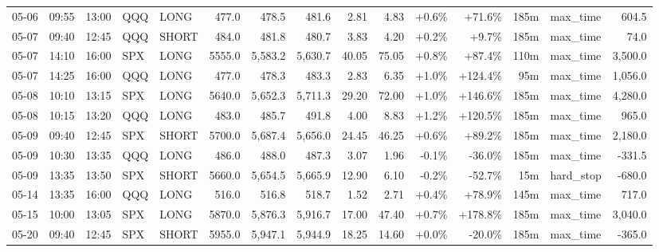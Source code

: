 \documentclass[11pt,a4paper,twoside]{article}
\begin{document}
\begin{landscape}
\begin{center}
\begin{longtable}{>{\color{txtmain}}l l l l l r r r r r r r r >{\color{txtmain}}l r}
05-06 & 09:55 & 13:00 & QQQ & LONG & 477.0 & 478.5 & 481.6 & 2.81 & 4.83 & \textcolor{wingreen}{+0.6\%} & \textcolor{wingreen}{+71.6\%} & 185m & max\_time & \textcolor{wingreen}{604.5} \\
05-07 & 09:40 & 12:45 & QQQ & SHORT & 484.0 & 481.8 & 480.7 & 3.83 & 4.20 & \textcolor{wingreen}{+0.2\%} & \textcolor{wingreen}{+9.7\%} & 185m & max\_time & \textcolor{wingreen}{74.0} \\
05-07 & 14:10 & 16:00 & SPX & LONG & 5555.0 & 5,583.2 & 5,630.7 & 40.05 & 75.05 & \textcolor{wingreen}{+0.8\%} & \textcolor{wingreen}{+87.4\%} & 110m & max\_time & \textcolor{wingreen}{3,500.0} \\
05-07 & 14:25 & 16:00 & QQQ & LONG & 477.0 & 478.3 & 483.3 & 2.83 & 6.35 & \textcolor{wingreen}{+1.0\%} & \textcolor{wingreen}{+124.4\%} & 95m & max\_time & \textcolor{wingreen}{1,056.0} \\
05-08 & 10:10 & 13:15 & SPX & LONG & 5640.0 & 5,652.3 & 5,711.3 & 29.20 & 72.00 & \textcolor{wingreen}{+1.0\%} & \textcolor{wingreen}{+146.6\%} & 185m & max\_time & \textcolor{wingreen}{4,280.0} \\
05-08 & 10:15 & 13:20 & QQQ & LONG & 483.0 & 485.7 & 491.8 & 4.00 & 8.83 & \textcolor{wingreen}{+1.2\%} & \textcolor{wingreen}{+120.5\%} & 185m & max\_time & \textcolor{wingreen}{965.0} \\
05-09 & 09:40 & 12:45 & SPX & SHORT & 5700.0 & 5,687.4 & 5,656.0 & 24.45 & 46.25 & \textcolor{wingreen}{+0.6\%} & \textcolor{wingreen}{+89.2\%} & 185m & max\_time & \textcolor{wingreen}{2,180.0} \\
05-09 & 10:30 & 13:35 & QQQ & LONG & 486.0 & 488.0 & 487.3 & 3.07 & 1.96 & \textcolor{lossred}{-0.1\%} & \textcolor{lossred}{-36.0\%} & 185m & max\_time & \textcolor{lossred}{-331.5} \\
05-09 & 13:35 & 13:50 & SPX & SHORT & 5660.0 & 5,654.5 & 5,665.9 & 12.90 & 6.10 & \textcolor{lossred}{-0.2\%} & \textcolor{lossred}{-52.7\%} & 15m & hard\_stop & \textcolor{lossred}{-680.0} \\
05-14 & 13:35 & 16:00 & QQQ & LONG & 516.0 & 516.8 & 518.7 & 1.52 & 2.71 & \textcolor{wingreen}{+0.4\%} & \textcolor{wingreen}{+78.9\%} & 145m & max\_time & \textcolor{wingreen}{717.0} \\
05-15 & 10:00 & 13:05 & SPX & LONG & 5870.0 & 5,876.3 & 5,916.7 & 17.00 & 47.40 & \textcolor{wingreen}{+0.7\%} & \textcolor{wingreen}{+178.8\%} & 185m & max\_time & \textcolor{wingreen}{3,040.0} \\
05-20 & 09:40 & 12:45 & SPX & SHORT & 5955.0 & 5,947.1 & 5,944.9 & 18.25 & 14.60 & \textcolor{wingreen}{+0.0\%} & \textcolor{lossred}{-20.0\%} & 185m & max\_time & \textcolor{lossred}{-365.0} \\

\end{longtable}
\end{center}
\end{landscape}
\end{document}
